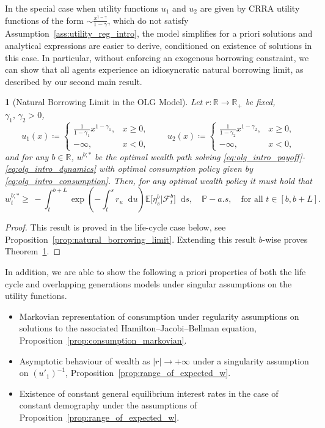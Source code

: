 \documentclass[11pt,oneside,english,reqno,dvipsnames,table]{amsart}
\numberwithin{equation}{section}
\theoremstyle{plain}
\newtheorem{thm}{\protect\theoremname}
\theoremstyle{definition}
\theoremstyle{remark}
\theoremstyle{plain}
\theoremstyle{plain}
\theoremstyle{plain}
\theoremstyle{plain}
\theoremstyle{plain}
\theoremstyle{plain}
\theoremstyle{plain}
\providecommand{\theoremname}{Theorem}
\newcommand{\cF}{\mathcal{F}}
\newcommand{\EE}{\mathbb{E}}
\newcommand{\PP}{\mathbb{P}}
\newcommand{\dd}{\mathop{}\!\mathrm{d}}
\newcommand{\mbR}{\mathbb{R}}
\numberwithin{thm}{section}
\begin{document}
In the special case when utility functions $u_1$ and $u_2$ are given by CRRA utility functions of the form $\sim \frac{x^{1-\gamma}}{1-\gamma}$, which do not satisfy Assumption~\ref{ass:utility_reg_intro}, the model simplifies for a priori solutions and analytical expressions are easier to derive, conditioned on existence of solutions in this case. In particular,  without enforcing an exogenous borrowing constraint, we can show that  all agents experience an idiosyncratic natural borrowing limit, as described by our second main result. 
%
\begin{thm}[Natural Borrowing Limit in the OLG Model]\label{thm:olg_natural_borrowing_limit}
%
Let $r:\mbR\to \mbR_+$ be fixed, $\gamma_1,\,\gamma_2>0$, 
    \begin{equation}
        u_1(x) \coloneqq \begin{cases}
            \frac{1}{1-\gamma_1}x^{1-\gamma_1}, & x\geq 0,\\
            -\infty, & x<0,
        \end{cases}
        \qquad 
        u_2(x) \coloneqq \begin{cases}
            \frac{1}{1-\gamma_2}x^{1-\gamma_2}, & x\geq 0,\\
            -\infty, & x<0,
        \end{cases}
    \end{equation}
    and for any $b\in \mbR$, $w^{b;*}$ be the optimal wealth path solving \eqref{eq:olg_intro_payoff}-\eqref{eq:olg_intro_dynamics} with optimal consumption policy given by \eqref{eq:olg_intro_consumption}. Then, for any optimal wealth policy it must hold that
   \begin{equation}
       w^{b;*}_t \geq \, - \int_t^{b+L} \exp\left(-\int_t^s r_u \dd u\right)\EE\big[ \eta^b_s|\cF^b_t\big]\dd s, \quad \PP-a.s, \quad \text{for all } t\in [b,b+L].
   \end{equation}
\end{thm}
%
\begin{proof}
This result is proved in the life-cycle case below, see Proposition~\ref{prop:natural_borrowing_limit}. Extending this result $b$-wise proves Theorem~\ref{thm:olg_natural_borrowing_limit}.
\end{proof}

In addition, we are able to show the following a priori properties of both the life cycle and overlapping generations models under singular assumptions on the utility functions.
%
\begin{itemize}
    \item Markovian representation of consumption under regularity assumptions on solutions to the associated Hamilton--Jacobi--Bellman equation, Proposition~\ref{prop:consumption_markovian}.
    \item Asymptotic behaviour of wealth as $|r|\to +\infty$ under a singularity assumption on $(u'_1)^{-1}$, Proposition~\ref{prop:range_of_expected_w}.
    \item Existence of constant general equilibrium interest rates in the case of constant demography under the assumptions of Proposition~\ref{prop:range_of_expected_w}.
\end{itemize}
\end{document}
